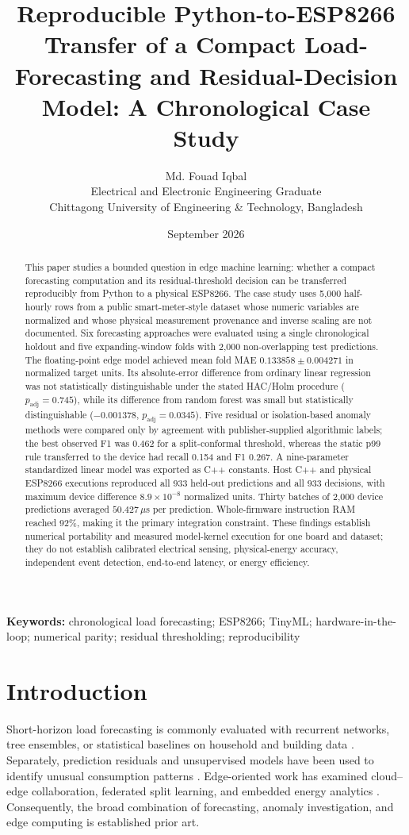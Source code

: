 \documentclass[10pt,a4paper,twocolumn]{article}
\title{\textbf{Reproducible Python-to-ESP8266 Transfer of a Compact Load-Forecasting and Residual-Decision Model: A Chronological Case Study}}
\author{Md. Fouad Iqbal\\
\small Electrical and Electronic Engineering Graduate\\
\small Chittagong University of Engineering \& Technology, Bangladesh}
\date{September 2026}
\begin{document}
\maketitle

\begin{abstract}
This paper studies a bounded question in edge machine learning: whether a compact forecasting computation and its residual-threshold decision can be transferred reproducibly from Python to a physical ESP8266. The case study uses 5,000 half-hourly rows from a public smart-meter-style dataset whose numeric variables are normalized and whose physical measurement provenance and inverse scaling are not documented. Six forecasting approaches were evaluated using a single chronological holdout and five expanding-window folds with 2,000 non-overlapping test predictions. The floating-point edge model achieved mean fold MAE $0.133858\pm0.004271$ in normalized target units. Its absolute-error difference from ordinary linear regression was not statistically distinguishable under the stated HAC/Holm procedure ($p_{\mathrm{adj}}=0.745$), while its difference from random forest was small but statistically distinguishable ($-0.001378$, $p_{\mathrm{adj}}=0.0345$). Five residual or isolation-based anomaly methods were compared only by agreement with publisher-supplied algorithmic labels; the best observed F1 was 0.462 for a split-conformal threshold, whereas the static p99 rule transferred to the device had recall 0.154 and F1 0.267. A nine-parameter standardized linear model was exported as C++ constants. Host C++ and physical ESP8266 executions reproduced all 933 held-out predictions and all 933 decisions, with maximum device difference $8.9\times10^{-8}$ normalized units. Thirty batches of 2,000 device predictions averaged $50.427\,\mu$s per prediction. Whole-firmware instruction RAM reached 92\%, making it the primary integration constraint. These findings establish numerical portability and measured model-kernel execution for one board and dataset; they do not establish calibrated electrical sensing, physical-energy accuracy, independent event detection, end-to-end latency, or energy efficiency.
\end{abstract}

\noindent\textbf{Keywords:} chronological load forecasting; ESP8266; TinyML; hardware-in-the-loop; numerical parity; residual thresholding; reproducibility

\section{Introduction}
Short-horizon load forecasting is commonly evaluated with recurrent networks, tree ensembles, or statistical baselines on household and building data \cite{shi2018pooling,kong2019lstm,aurangzeb2024bilstm}. Separately, prediction residuals and unsupervised models have been used to identify unusual consumption patterns \cite{liu2018scalable,utomo2020multitiered,hernandez2024daily}. Edge-oriented work has examined cloud--edge collaboration, federated split learning, and embedded energy analytics \cite{hu2020edge,li2024federated,kolosov2025instrumental}. Consequently, the broad combination of forecasting, anomaly investigation, and edge computing is established prior art.
\end{document}
